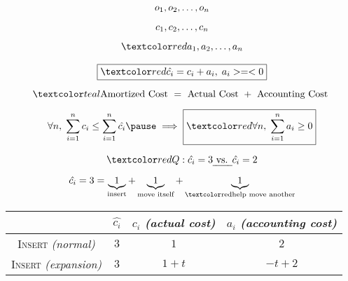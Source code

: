 \begin{frame}{}
  \centerline{}

  \vspace{-0.50cm}
  \begin{gather*}
    o_1, o_2, \ldots, o_n \\[5pt]
    c_1, c_2, \ldots, c_n \\[5pt]
    \red{a_1, a_2, \ldots, a_n}
  \end{gather*}

  \pause
  \vspace{-0.30cm}
  \[
    \boxed{\red{\hat{c_i} = c_i + a_i, \; a_i >=< 0}}
  \]

  \[
    \teal{\text{Amortized Cost } = \text{ Actual Cost } + \text{ Accounting Cost }}
  \]

  \pause
  \[
    \forall n,\; \sum_{i=1}^{n} c_i \le \sum_{i=1}^{n} \hat{c_i} \pause \implies \boxed{\red{\forall n,\; \sum_{i=1}^{n} a_i \geq 0}}
  \]

  \pause
  \begin{center}
    {\large {}}
  \end{center}
\end{frame}

\begin{frame}{}
  \centerline{}

  \[
    \red{Q:}\; \hat{c_i} = 3 \text{\emph{ vs. }} \hat{c_i} = 2
  \]

  \pause
  \[
    \hat{c_i} = 3 = \underbrace{1}_{\textrm{insert}} +
    \underbrace{1}_{\textrm{move itself}} + \underbrace{1}_{\textrm{\red{help move another}}}
  \]

  \pause
  \vspace{0.30cm}
  \begin{table}
    \begin{tabular}{c|ccc}
      & $\hat{c_i}$ & $c_i$ {\it (actual cost)} & $a_i$ {\it (accounting cost)}
      \\ \hline
      \textsc{Insert} {\it (normal)} & $3$ & $1$ & $2$\\
      \textsc{Insert} {\it (expansion)} & $3$ & $1 + t$ & $-t + 2$
    \end{tabular}
  \end{table}
\end{frame}

